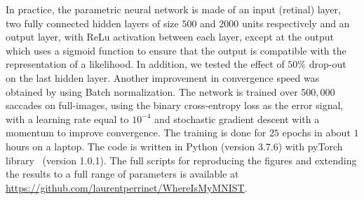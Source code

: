 

In practice, the parametric neural network is made of an input (retinal) layer, two fully connected hidden layers of size $500$ and $2000$ units respectively and an output layer, with ReLu activation between each layer, except at the output which uses a sigmoid function to ensure that the output is compatible with the representation of a likelihood. In addition, we tested the effect of $50 \%$ drop-out on the last hidden layer. Another improvement in convergence speed was obtained by using Batch normalization. The network is trained over $500,000$ saccades on full-images, using the binary cross-entropy loss as the error signal, with a learning rate equal to $10^{-4}$ and stochastic gradient descent with a momentum to improve convergence. The training is done for $25$ epochs in about $1$ hours on a laptop. The code is written in Python (version 3.7.6) with pyTorch library~\citep{Paszke17} (version 1.0.1). The full scripts for reproducing the figures and extending the results to a full range of parameters is available at \url{https://github.com/laurentperrinet/WhereIsMyMNIST}. %
